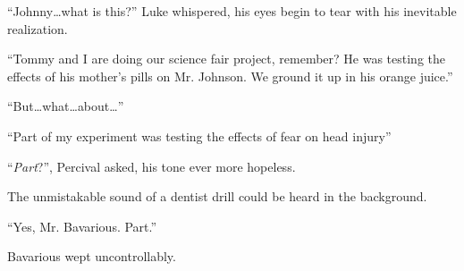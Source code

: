 ``Johnny{\ldots}what is this?'' Luke whispered, his eyes
begin to tear with his inevitable realization.

``Tommy and I are doing our science fair project, remember? He
was testing the effects of his mother's pills on Mr. Johnson.
We ground it up in his orange juice.''

``But{\ldots}what{\ldots}about{\ldots}''

``Part of my experiment was testing the effects of fear on
head injury''

``{\em Part}?'', Percival asked, his tone ever more
hopeless.

The unmistakable sound of a dentist drill could be heard in the
background.

``Yes, Mr. Bavarious. Part.''

Bavarious wept uncontrollably. 
 





